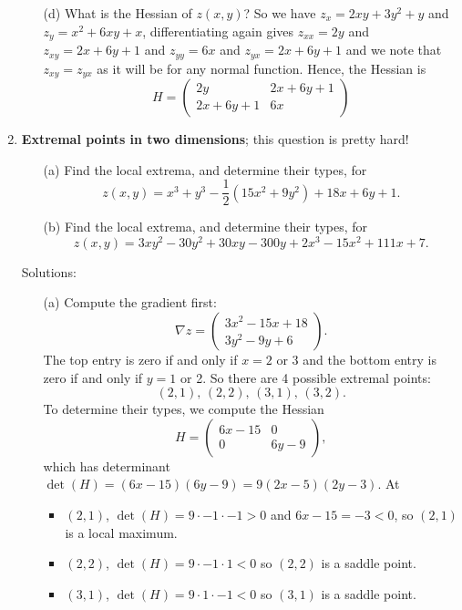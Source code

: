 \documentclass[11pt,a4paper]{scrartcl}
\begin{document}
\begin{enumerate}
\begin{itemize}
        \item[(d)] What is the Hessian of $z(x,y)$? So we have $z_x=2xy+3y^2+y$ and $z_y=x^2+6xy+x$, differentiating again gives $z_{xx}=2y$ and $z_{xy}=2x+6y+1$ and $z_{yy}=6x$ and $z_{yx}=2x+6y+1$ and we note that $z_{xy}=z_{yx}$ as it will be for any normal function. Hence, the Hessian is
          \begin{equation}
            H=\left(\begin{array}{cc}2y&2x+6y+1\\2x+6y+1&6x\end{array}\right)
          \end{equation}
\end{itemize}

	\item \textbf{Extremal points in two dimensions}; this question is pretty hard!
	\begin{itemize}
		\item[(a)] Find the local extrema, and determine their types, for
		  \[z(x,y) = x^3 + y^3 - \frac{1}{2}(15x^2 + 9y^2) + 18x + 6y + 1.\]
		\item[(b)] Find the local extrema, and determine their types, for
		\[z(x,y) = 3xy^2 - 30y^2 + 30xy - 300y + 2x^3 - 15x^2 + 111x + 7.\]
	\end{itemize}
	Solutions:
	\begin{itemize}
		\item[(a)] Compute the gradient first:
		\[\nabla z = \left(\begin{array}{c}
			3x^2 - 15x + 18 \\
			3y^2 - 9y + 6
		\end{array}\right).\]
		The top entry is zero if and only if $x = 2$ or 3 and the bottom entry is 
		zero if and only if $y = 1$ or 2.
		So there are 4 possible extremal points:
		\[(2,1),\, (2,2),\, (3,1),\, (3,2).\]
		To determine their types, we compute the Hessian
		\[H = \left(\begin{array}{cc}
		6x - 15 & 0 \\
		0 & 6y - 9
		\end{array}\right),\]
		which has determinant $\det(H) = (6x-15)(6y-9) = 9(2x-5)(2y-3)$.
		At
		\begin{itemize}
			\item $(2,1)$, $\det(H) = 9\cdot -1 \cdot -1 > 0$ and $6x - 15 = -3 < 0$, so
			$(2,1)$ is a local maximum.
			\item $(2,2)$, $\det(H) = 9\cdot -1 \cdot 1 < 0$ so $(2,2)$ is a saddle point.
			\item $(3,1)$, $\det(H) = 9\cdot 1 \cdot -1 < 0$ so $(3,1)$ is a saddle point.

\end{itemize}
\end{itemize}
\end{enumerate}
\end{document}
